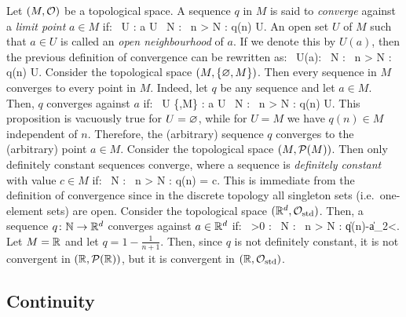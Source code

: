 \bd
Let $(M,\mathcal{O})$ be a topological space. A sequence $q$ in $M$ is said to \emph{converge} against a \emph{limit point} $a\in M$ if:
\bse
\forall \, U \in \cO : a \in U \imp \exists \, N \in \N : \forall \, n > N : q(n) \in U.
\ese
\ed
\br
An open set $U$ of $M$ such that $a\in U$ is called an \emph{open neighbourhood} of $a$. If we denote this by $U(a)$, then the previous definition of convergence can be rewritten as:
\bse
\forall \, U(a): \exists \, N \in \N : \forall \, n > N : q(n) \in U.
\ese
\er
\be
Consider the topological space $(M,\{\varnothing,M\})$. Then every sequence in $M$ converges to every point in $M$. Indeed, let $q$ be any sequence and let $a \in M$. Then, $q$ converges against $a$ if:
\bse
\forall \, U \in \{\vn,M\} : a \in U \imp \exists \, N \in \N : \forall \, n > N : q(n) \in U.
\ese
This proposition is vacuously true for $U=\varnothing$, while for $U=M$ we have $q(n)\in M$ independent of $n$. Therefore, the (arbitrary) sequence $q$ converges to the (arbitrary) point $a\in M$. 
\ee
\be
Consider the topological space $(M,\mathcal{P}(M))$. Then only definitely constant sequences converge, where a sequence is \emph{definitely constant} with value $c\in M$ if:
\bse
\exists \, N \in \N : \forall \, n > N : q(n) = c.
\ese
This is immediate from the definition of convergence since in the discrete topology all singleton sets (i.e.\ one-element sets) are open. 
\ee
\bt[Convergence in $\R^d$]
Consider the topological space $(\mathbb{R}^d,\mathcal{O}_\mathrm{std})$. Then, a sequence $q\colon \mathbb{N} \to \mathbb{R}^d$ converges against $a\in \mathbb{R}^d$ if:
\bse
\forall\, \ve >0 : \exists \, N \in \N : \forall \, n > N : \|q(n)-a\|_2<\ve.
\ese
\et
\be
Let $M=\mathbb{R}$ and let $q=1-\frac{1}{n+1}$. Then, since $q$ is not definitely constant, it is not convergent in $(\mathbb{R},\mathcal{P}(\mathbb{R}))$, but it is convergent in $(\mathbb{R},\mathcal{O}_\mathrm{std})$.
\ee

\subsection{Continuity}

